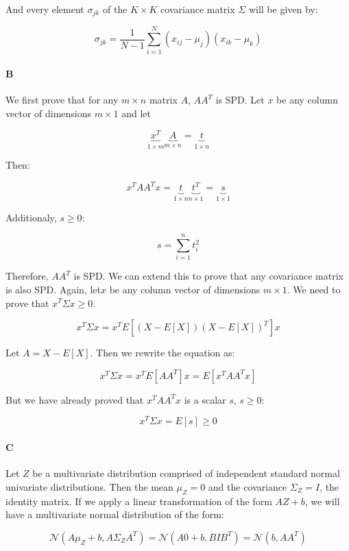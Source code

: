 \documentclass[12pt]{article}
\begin{document}
And every element $\sigma_{jk}$ of the $K \times K$ covariance matrix $\Sigma$ will be given by:

\begin{equation}
\sigma_{jk}=\frac{1}{N-1}\displaystyle\sum_{i=1}^{N}{(x_{ij}-\mu_j)(x_{ik}-\mu_{k})}
\end{equation}

\paragraph{B}

We first prove that for any $m \times n$ matrix $A$, $AA^T$ is SPD. Let $x$ be any column vector of dimensions $m\times1$ and let

\[
\underbrace{x^T}_{1\times m}\underbrace{A}_{m\times n}=\underbrace{t}_{1\times n}
\]

Then:

\[
x^TAA^Tx = \underbrace{t}_{1\times n}\underbrace{t^T}_{n \times 1} = \underbrace{s}_{1\times 1}
\]

Additionaly, $s\geq 0$:

\[s = \displaystyle\sum_{i=1}^n{t_i^2}\]

Therefore, $AA^T$ is SPD. We can extend this to prove that any covariance matrix is also SPD. Again, let$x$ be any column vector of dimensions $m\times1$. We need to prove that $x^T\Sigma x \geq 0$.

\[
x^T\Sigma x=x^TE\left[\left(X-E[X]\right)\left(X-E[X]\right)^T\right]x
\]

Let $A=X-E[X]$. Then we rewrite the equation as:

\[
x^T\Sigma x=x^TE\left[AA^T\right]x = E\left[x^TAA^Tx\right]
\]

But we have already proved that $x^TAA^Tx$ is a scalar $s$, $s \geq 0$:

\[
x^T\Sigma x  =E\left[s\right] \geq 0
\]

\paragraph{C}
Let $Z$ be a multivariate distribution comprised of independent standard normal univariate distributions. Then the mean $\mu_Z = 0$ and the covariance $\Sigma_Z=I$, the identity matrix. If we apply a linear transformation of the form $AZ + b$, we will have a multivariate normal distribution of the form:

\[
\mathcal{N}\left(A\mu_Z + b, A\Sigma_Z A^T\right) = \mathcal{N}\left(A0 + b, BIB^T\right) = \mathcal{N}\left(b, AA^T\right)
\]
\end{document}
